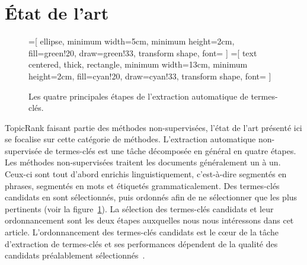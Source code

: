 \section{État de l'art}
\label{sec:etat_de_l_art}
  \begin{figure}
    =[
      ellipse,
      minimum width=5cm,
      minimum height=2cm,
      fill=green!20,
      draw=green!33,
      transform shape,
      font={\huge}
    ]
    =[
      text centered,
      thick,
      rectangle,
      minimum width=13cm,
      minimum height=2cm,
      fill=cyan!20,
      draw=cyan!33,
      transform shape,
      font={\huge\bfseries}
    ]

    \centering
    \caption{Les quatre principales étapes de l'extraction automatique de
             termes-clés. \label{fig:etapes_de_l_extraction_de_termes_cles}}
  \end{figure}
  TopicRank faisant partie des méthodes non-supervisées, l'état de l'art
  présenté ici se focalise sur cette catégorie de méthodes. L'extraction
  automatique non-supervisée de termes-clés est une tâche décomposée en général
  en quatre étapes. Les méthodes non-supervisées traitent les documents
  généralement un à un. Ceux-ci sont tout d'abord enrichis linguistiquement,
  c'est-à-dire segmentés en phrases, segmentés en mots  et étiquetés
  grammaticalement. Des termes-clés candidats en sont sélectionnés, puis
  ordonnés afin de ne sélectionner que les plus pertinents (voir la
  figure~\ref{fig:etapes_de_l_extraction_de_termes_cles}). La sélection des
  termes-clés candidats et leur ordonnancement sont les deux étapes auxquelles
  nous nous intéressons dans cet article. L'ordonnancement des termes-clés
  candidats est le c\oe{}ur de la tâche d'extraction de termes-clés et ses
  performances dépendent de la qualité des candidats préalablement
  sélectionnés~\cite{wang2014keyphraseextractionpreprocessing}.

